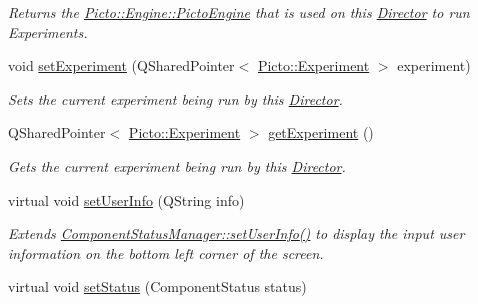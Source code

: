 \begin{DoxyCompactItemize}
\begin{DoxyCompactList}\small\item\em Returns the \hyperlink{class_picto_1_1_engine_1_1_picto_engine}{Picto\-::\-Engine\-::\-Picto\-Engine} that is used on this \hyperlink{class_director}{Director} to run Experiments. \end{DoxyCompactList}\item 
\hypertarget{class_director_status_manager_a24f41d8039a1011c9bc35b113273fa88}{void \hyperlink{class_director_status_manager_a24f41d8039a1011c9bc35b113273fa88}{set\-Experiment} (Q\-Shared\-Pointer$<$ \hyperlink{class_picto_1_1_experiment}{Picto\-::\-Experiment} $>$ experiment)}\label{class_director_status_manager_a24f41d8039a1011c9bc35b113273fa88}

\begin{DoxyCompactList}\small\item\em Sets the current experiment being run by this \hyperlink{class_director}{Director}. \end{DoxyCompactList}\item 
\hypertarget{class_director_status_manager_a0dcb0e210becf04a832b35f0f3eb5247}{Q\-Shared\-Pointer$<$ \hyperlink{class_picto_1_1_experiment}{Picto\-::\-Experiment} $>$ \hyperlink{class_director_status_manager_a0dcb0e210becf04a832b35f0f3eb5247}{get\-Experiment} ()}\label{class_director_status_manager_a0dcb0e210becf04a832b35f0f3eb5247}

\begin{DoxyCompactList}\small\item\em Gets the current experiment being run by this \hyperlink{class_director}{Director}. \end{DoxyCompactList}\item 
\hypertarget{class_director_status_manager_a10d0fc15364fa73814c90c9c5300708c}{virtual void \hyperlink{class_director_status_manager_a10d0fc15364fa73814c90c9c5300708c}{set\-User\-Info} (Q\-String info)}\label{class_director_status_manager_a10d0fc15364fa73814c90c9c5300708c}

\begin{DoxyCompactList}\small\item\em Extends \hyperlink{class_component_status_manager_a3621411701b009a63a676d5016aecfad}{Component\-Status\-Manager\-::set\-User\-Info()} to display the input user information on the bottom left corner of the screen. \end{DoxyCompactList}\item 
\hypertarget{class_director_status_manager_a9fa585fdad94b511c03380b9a5926fb5}{virtual void \hyperlink{class_director_status_manager_a9fa585fdad94b511c03380b9a5926fb5}{set\-Status} (Component\-Status status)}\label{class_director_status_manager_a9fa585fdad94b511c03380b9a5926fb5}


\end{DoxyCompactItemize}
